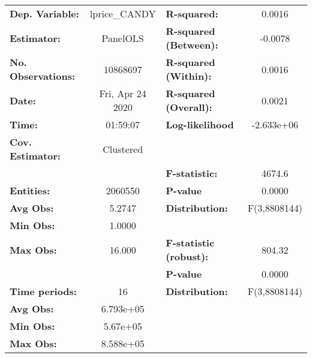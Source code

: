 \documentclass{report}
\begin{document}
\begin{center}
\begin{tabular}{lclc}
\toprule
\textbf{Dep. Variable:}       &   lprice\_CANDY    & \textbf{  R-squared:         }   &      0.0016      \\
\textbf{Estimator:}           &      PanelOLS      & \textbf{  R-squared (Between):}  &     -0.0078      \\
\textbf{No. Observations:}    &      10868697      & \textbf{  R-squared (Within):}   &      0.0016      \\
\textbf{Date:}                &  Fri, Apr 24 2020  & \textbf{  R-squared (Overall):}  &      0.0021      \\
\textbf{Time:}                &      01:59:07      & \textbf{  Log-likelihood     }   &    -2.633e+06    \\
\textbf{Cov. Estimator:}      &     Clustered      & \textbf{                     }   &                  \\
\textbf{}                     &                    & \textbf{  F-statistic:       }   &      4674.6      \\
\textbf{Entities:}            &      2060550       & \textbf{  P-value            }   &      0.0000      \\
\textbf{Avg Obs:}             &       5.2747       & \textbf{  Distribution:      }   &   F(3,8808144)   \\
\textbf{Min Obs:}             &       1.0000       & \textbf{                     }   &                  \\
\textbf{Max Obs:}             &       16.000       & \textbf{  F-statistic (robust):} &      804.32      \\
\textbf{}                     &                    & \textbf{  P-value            }   &      0.0000      \\
\textbf{Time periods:}        &         16         & \textbf{  Distribution:      }   &   F(3,8808144)   \\
\textbf{Avg Obs:}             &     6.793e+05      & \textbf{                     }   &                  \\
\textbf{Min Obs:}             &      5.67e+05      & \textbf{                     }   &                  \\
\textbf{Max Obs:}             &     8.588e+05      & \textbf{                     }   &                  \\
\bottomrule
\end{tabular}
\begin{tabular}{lcccccc}

\end{tabular}
\end{center}
\end{document}

